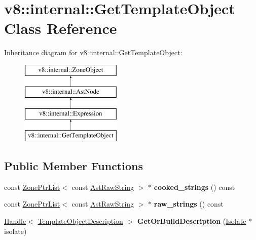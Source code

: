 \hypertarget{classv8_1_1internal_1_1GetTemplateObject}{}\section{v8\+:\+:internal\+:\+:Get\+Template\+Object Class Reference}
\label{classv8_1_1internal_1_1GetTemplateObject}
Inheritance diagram for v8\+:\+:internal\+:\+:Get\+Template\+Object\+:\begin{figure}[H]
\begin{center}
\leavevmode
\includegraphics[height=4.000000cm]{classv8_1_1internal_1_1GetTemplateObject}
\end{center}
\end{figure}
\subsection*{Public Member Functions}
\begin{DoxyCompactItemize}
\item 
\mbox{\label{classv8_1_1internal_1_1GetTemplateObject_ae6bd0ee5c1e53822f55fbef59a31bcfd}} 
const \mbox{\hyperlink{classv8_1_1internal_1_1ZoneList}{Zone\+Ptr\+List}}$<$ const \mbox{\hyperlink{classv8_1_1internal_1_1AstRawString}{Ast\+Raw\+String}} $>$ $\ast$ {\bfseries cooked\+\_\+strings} () const
\item 
\mbox{\label{classv8_1_1internal_1_1GetTemplateObject_ad707c7bdd7e8094fc2350af48ec3d0e7}} 
const \mbox{\hyperlink{classv8_1_1internal_1_1ZoneList}{Zone\+Ptr\+List}}$<$ const \mbox{\hyperlink{classv8_1_1internal_1_1AstRawString}{Ast\+Raw\+String}} $>$ $\ast$ {\bfseries raw\+\_\+strings} () const
\item 
\mbox{\label{classv8_1_1internal_1_1GetTemplateObject_a0a4777c274cea5e7eedd2d25f461883f}} 
\mbox{\hyperlink{classv8_1_1internal_1_1Handle}{Handle}}$<$ \mbox{\hyperlink{classv8_1_1internal_1_1TemplateObjectDescription}{Template\+Object\+Description}} $>$ {\bfseries Get\+Or\+Build\+Description} (\mbox{\hyperlink{classv8_1_1internal_1_1Isolate}{Isolate}} $\ast$isolate)
\end{DoxyCompactItemize}
